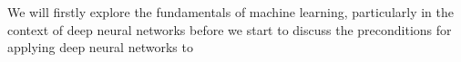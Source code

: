 We will firstly explore the fundamentals of machine learning, particularly in the context of deep neural networks before we start to discuss the preconditions for applying deep neural networks to 
